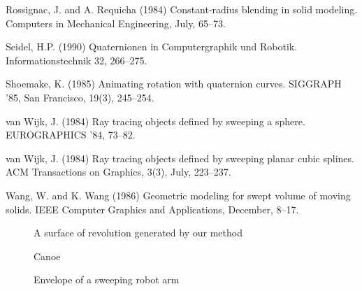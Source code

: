 \begin{thebibliography}{Shoemake 85}
Rossignac, J. and A. Requicha (1984)
Constant-radius blending in solid modeling.
Computers in Mechanical Engineering, July, 65--73.

Seidel, H.P. (1990) Quaternionen in Computergraphik und Robotik.
Informationstechnik 32, 266--275.

Shoemake, K. (1985) Animating rotation with quaternion curves.
SIGGRAPH '85, San Francisco, 19(3), 245--254.

van Wijk, J. (1984)
Ray tracing objects defined by sweeping a sphere.
EUROGRAPHICS '84, 73--82.

van Wijk, J. (1984)
Ray tracing objects defined by sweeping planar cubic splines.
ACM Transactions on Graphics, 3(3), July, 223--237.

Wang, W. and K. Wang (1986)
Geometric modeling for swept volume of moving solids.
IEEE Computer Graphics and Applications, December, 8--17.

\end{thebibliography}

\begin{figure}[h]
\vspace{2.75in}
\caption{A surface of revolution generated by our method}
\label{fig:coke}
\end{figure}


\begin{figure}[h]
\vspace{2.75in}
\caption{Canoe}
\label{fig:canoe}
\end{figure}

\begin{figure}[h]
\vspace{2.75in}
\caption{Envelope of a sweeping robot arm}
\label{fig:robot}
\end{figure}


